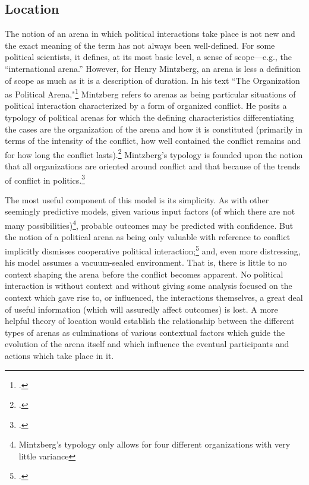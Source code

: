 \documentclass[openany,twoside]{memoir}
\begin{document}
\begin{Spacing}{2}
\subsection{Location}
The notion of an arena in which political interactions take place is not new and the exact meaning of the term has not always been well-defined. 
For some political scientists, it defines, at its most basic level, a sense of scope---e.g., the ``international arena.'' 
However, for Henry Mintzberg, an arena is less a definition of scope as much as it is a description of duration. 
In his text ``The Organization as Political Arena,"\footcite{mintzberg85} Mintzberg refers to arenas as being particular situations of political interaction characterized by a form of organized conflict. 
He posits a typology of political arenas for which the defining characteristics differentiating the cases are the organization of the arena and how it is constituted (primarily in terms of the intensity of the conflict, how well contained the conflict remains and for how long the conflict lasts).\footcite[141]{mintzberg85} 
Mintzberg's typology is founded upon the notion that all organizations are oriented around conflict and that because of the trends of conflict in politics.\footcite{mintzberg85}

The most useful component of this model is its simplicity. 
As with other seemingly predictive models, given various input factors (of which there are not many possibilities)\footnote{
Mintzberg's typology only allows for four different organizations with very little variance}, 
probable outcomes may be predicted with confidence. 
But the notion of a political arena as being only valuable with reference to conflict implicitly dismisses cooperative political interaction;\footcite[152]{mintzberg85} and, even more distressing, his model assumes a vacuum-sealed environment. 
That is, there is little to no context shaping the arena before the conflict becomes apparent. 
No political interaction is without context and without giving some analysis focused on the context which gave rise to, or influenced, the interactions themselves, a great deal of useful information (which will assuredly affect outcomes) is lost.
A more helpful theory of location would establish the relationship between the different types of arenas as culminations of various contextual factors which guide the evolution of the arena itself and which influence the eventual participants and actions which take place in it.


\end{Spacing}
\end{document}
